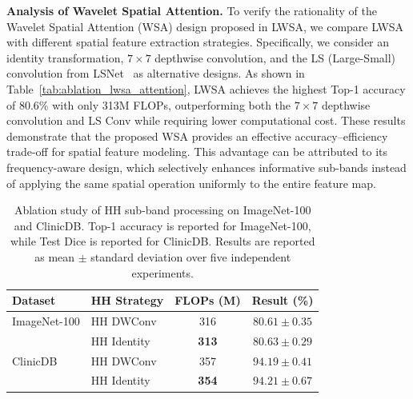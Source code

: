 \documentclass[a4paper,fleqn]{cas-dc}
\begin{document}
\textbf{Analysis of Wavelet Spatial Attention.} 
To verify the rationality of the Wavelet Spatial Attention (WSA) design proposed in LWSA, we compare LWSA with different spatial feature extraction strategies. Specifically, we consider an identity transformation, $7\times7$ depthwise convolution, and the LS (Large-Small) convolution from LSNet~\cite{wang2025lsnet} as alternative designs. As shown in Table~\ref{tab:ablation_lwsa_attention}, LWSA achieves the highest Top-1 accuracy of 80.6\% with only 313M FLOPs, outperforming both the $7\times7$ depthwise convolution and LS Conv while requiring lower computational cost. These results demonstrate that the proposed WSA provides an effective accuracy--efficiency trade-off for spatial feature modeling.
{
This advantage can be attributed to its frequency-aware design, which selectively enhances informative sub-bands instead of applying the same spatial operation uniformly to the entire feature map.
}



\begin{table}[pos=h]
\centering
\caption{\color{green}
Ablation study of HH sub-band processing on ImageNet-100 and ClinicDB.
Top-1 accuracy is reported for ImageNet-100, while Test Dice is reported
for ClinicDB. Results are reported as mean $\pm$ standard deviation over
five independent experiments.}
\label{tab:HH_method}

\small
\setlength{\tabcolsep}{4pt}

\begin{tabular}{llcc}
\toprule
Dataset & HH Strategy & FLOPs (M) & Result (\%) \\
\midrule
ImageNet-100
& HH DWConv
& 316
& $80.61 \pm 0.35$ \\

& HH Identity
& \textbf{313}
& $\mathbf{80.63 \pm 0.29}$ \\

\midrule
ClinicDB
& HH DWConv
& 357
& $94.19 \pm 0.41$ \\

& HH Identity
& \textbf{354}
& $\mathbf{94.21 \pm 0.67}$ \\
\bottomrule
\end{tabular}

\end{table}
\end{document}
